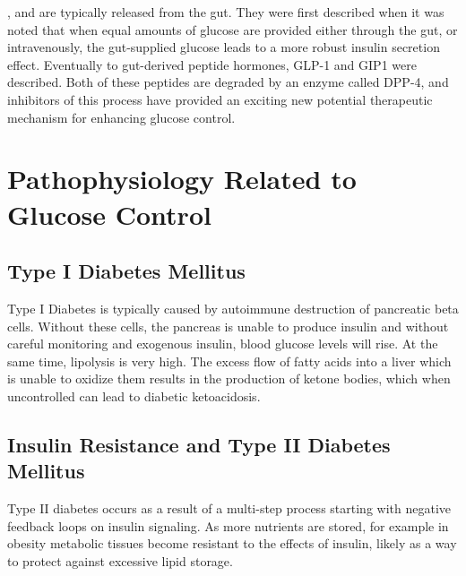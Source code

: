 \documentclass{tufte-handout}
\begin{document}
, and are typically released from the gut.  They were first described when it was noted that when equal amounts of glucose are provided either through the gut, or intravenously, the gut-supplied glucose leads to a more robust insulin secretion effect.  Eventually to gut-derived peptide hormones, GLP-1 and GIP1 were described.  Both of these peptides are degraded by an enzyme called DPP-4, and inhibitors of this process have provided an exciting new potential therapeutic mechanism for enhancing glucose control.

\section{Pathophysiology Related to Glucose Control}

\subsection{Type I Diabetes Mellitus}

Type I Diabetes is typically caused by autoimmune destruction of pancreatic beta cells.  Without these cells, the pancreas is unable to produce insulin and without careful monitoring and exogenous insulin, blood glucose levels will rise.  At the same time, lipolysis is very high.  The excess flow of fatty acids into a liver which is unable to oxidize them results in the production of ketone bodies, which when uncontrolled can lead to diabetic ketoacidosis.

\subsection{Insulin Resistance and Type II Diabetes Mellitus}

Type II diabetes occurs as a result of a multi-step process starting with negative feedback loops on insulin signaling.  As more nutrients are stored, for example in obesity metabolic tissues become resistant to the effects of insulin, likely as a way to protect against excessive lipid storage.  
\end{document}
